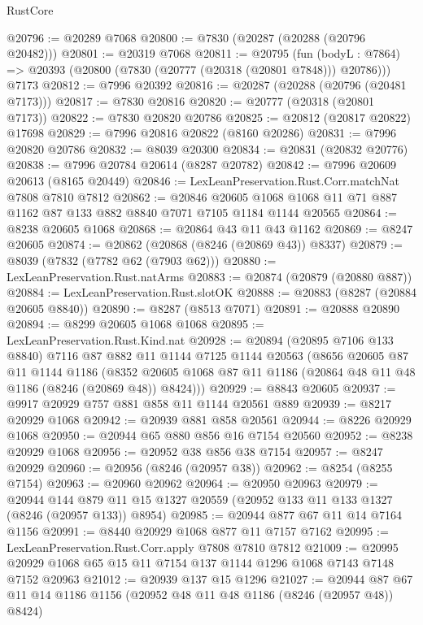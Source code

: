 \begin{lexlean}{RustCore}
\begin{coremodule}
@20796 := @20289 @7068
@20800 := @7830 (@20287 (@20288 (@20796 @20482)))
@20801 := @20319 @7068
@20811 := @20795
    (fun (bodyL : @7864) => @20393 (@20800 (@7830 (@20777 (@20318 (@20801 @7848))) @20786)))
    @7173
@20812 := @7996 @20392
@20816 := @20287 (@20288 (@20796 (@20481 @7173)))
@20817 := @7830 @20816
@20820 := @20777 (@20318 (@20801 @7173))
@20822 := @7830 @20820 @20786
@20825 := @20812 (@20817 @20822) @17698
@20829 := @7996 @20816 @20822 (@8160 @20286)
@20831 := @7996 @20820 @20786
@20832 := @8039 @20300
@20834 := @20831 (@20832 @20776)
@20838 := @7996 @20784 @20614 (@8287 @20782)
@20842 := @7996 @20609 @20613 (@8165 @20449)
@20846 := LexLeanPreservation.Rust.Corr.matchNat @7808 @7810 @7812
@20862 := @20846
    @20605
    @1068
    @1068
    @11
    @71
    @887
    @1162
    @87
    @133
    @882
    @8840
    @7071
    @7105
    @1184
    @1144
    @20565
@20864 := @8238 @20605 @1068
@20868 := @20864 @43 @11 @43 @1162
@20869 := @8247 @20605
@20874 := @20862 (@20868 (@8246 (@20869 @43)) @8337)
@20879 := @8039 (@7832 (@7782 @62 (@7903 @62)))
@20880 := LexLeanPreservation.Rust.natArms
@20883 := @20874 (@20879 (@20880 @887))
@20884 := LexLeanPreservation.Rust.slotOK
@20888 := @20883 (@8287 (@20884 @20605 @8840))
@20890 := @8287 (@8513 @7071)
@20891 := @20888 @20890
@20894 := @8299 @20605 @1068 @1068
@20895 := LexLeanPreservation.Rust.Kind.nat
@20928 := @20894
    (@20895 @7106 @133 @8840)
    @7116
    @87
    @882
    @11
    @1144
    @7125
    @1144
    @20563
    (@8656
      @20605
      @87
      @11
      @1144
      @1186
      (@8352 @20605 @1068 @87 @11 @1186 (@20864 @48 @11 @48 @1186 (@8246 (@20869 @48)) @8424)))
@20929 := @8843 @20605
@20937 := @9917 @20929 @757 @881 @858 @11 @1144 @20561 @889
@20939 := @8217 @20929 @1068
@20942 := @20939 @881 @858 @20561
@20944 := @8226 @20929 @1068
@20950 := @20944 @65 @880 @856 @16 @7154 @20560
@20952 := @8238 @20929 @1068
@20956 := @20952 @38 @856 @38 @7154
@20957 := @8247 @20929
@20960 := @20956 (@8246 (@20957 @38))
@20962 := @8254 (@8255 @7154)
@20963 := @20960 @20962
@20964 := @20950 @20963
@20979 := @20944
    @144
    @879
    @11
    @15
    @1327
    @20559
    (@20952 @133 @11 @133 @1327 (@8246 (@20957 @133)) @8954)
@20985 := @20944 @877 @67 @11 @14 @7164 @1156
@20991 := @8440 @20929 @1068 @877 @11 @7157 @7162
@20995 := LexLeanPreservation.Rust.Corr.apply @7808 @7810 @7812
@21009 := @20995 @20929 @1068 @65 @15 @11 @7154 @137 @1144 @1296 @1068 @7143 @7148 @7152 @20963
@21012 := @20939 @137 @15 @1296
@21027 := @20944 @87 @67 @11 @14 @1186 @1156 (@20952 @48 @11 @48 @1186 (@8246 (@20957 @48)) @8424)

\end{coremodule}
\end{lexlean}
